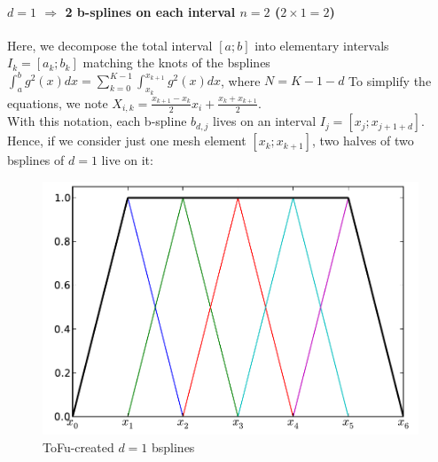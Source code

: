 \documentclass[paper=a4, fontsize=11pt]{scrartcl}
\numberwithin{equation}{section}		%
\numberwithin{figure}{section}			%
\numberwithin{table}{section}				%
\begin{document}
\newpage
\begin{landscape}


\paragraph{\textbf{$d=1$ $\Rightarrow$ 2 b-splines on each interval $n=2$ ($2\times1=2$)}}
Here, we decompose the total interval $[a;b]$ into elementary intervals $I_k=[a_k;b_k]$ matching the knots of the bsplines $\int_a^b g^2(x)dx = \sum_{k=0}^{K-1} \int_{x_k}^{x_{k+1}} g^2(x)dx$, where $N=K-1-d$
To simplify the equations, we note $X_{i,k} = \frac{x_{k+1}-x_k}{2}x_i + \frac{x_k+x_{k+1}}{2}$.\\
With this notation, each b-spline $b_{d,j}$ lives on an interval $I_j = [x_{j};x_{j+1+d}]$.
Hence, if we consider just one mesh element $[x_k;x_{k+1}]$, two halves of two bsplines of $d=1$ live on it:

\begin{figure}
  \vspace{-20pt}
  \begin{center}
    \includegraphics[scale=0.4]{Fig00_BSplines_Int_D1.pdf}
  \end{center}
  \vspace{-20pt}
  \caption{\footnotesize ToFu-created $d=1$ bsplines}
  \vspace{-10pt}
\end{figure}


\end{landscape}
\end{document}
